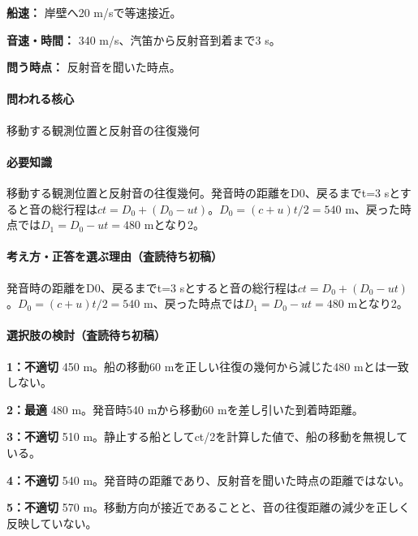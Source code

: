 \noindent\textbf{船速：} 岸壁へ20 m/sで等速接近。\par

\noindent\textbf{音速・時間：} 340 m/s、汽笛から反射音到着まで3 s。\par

\noindent\textbf{問う時点：} 反射音を聞いた時点。\par

\paragraph{問われる核心} 移動する観測位置と反射音の往復幾何

\paragraph{必要知識} 移動する観測位置と反射音の往復幾何。発音時の距離をD0、戻るまでt=\allowbreak{}3 sとすると音の総行程は\(ct=D_0+(D_0-ut)\)。\(D_0=(c+u)t/2=540\) m、戻った時点では\(D_1=D_0-ut=480\) mとなり2。

\paragraph{考え方・正答を選ぶ理由（査読待ち初稿）} 発音時の距離をD0、戻るまでt=\allowbreak{}3 sとすると音の総行程は\(ct=D_0+(D_0-ut)\)。\(D_0=(c+u)t/2=540\) m、戻った時点では\(D_1=D_0-ut=480\) mとなり2。

\paragraph{選択肢の検討（査読待ち初稿）}\mbox{}\par

\noindent\textbf{1：不適切} 450 m。船の移動60 mを正しい往復の幾何から減じた480 mとは一致しない。\par

\noindent\textbf{2：最適} 480 m。発音時540 mから移動60 mを差し引いた到着時距離。\par

\noindent\textbf{3：不適切} 510 m。静止する船としてct/2を計算した値で、船の移動を無視している。\par

\noindent\textbf{4：不適切} 540 m。発音時の距離であり、反射音を聞いた時点の距離ではない。\par

\noindent\textbf{5：不適切} 570 m。移動方向が接近であることと、音の往復距離の減少を正しく反映していない。\par

